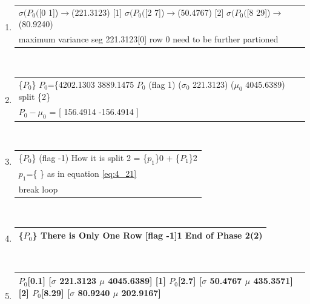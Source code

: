 \begin{center}
\begin{enumerate}
\begin{tabular}{ | p{15cm} | }
\hline 
\end{tabular}\\ \vspace{3mm}

\item \begin{tabular}{ | p{15cm} | }\hline 
            [0] $\sigma(P_0($[0 1])$\rightarrow$(221.3123)
            [1] $\sigma(P_0($[2 7])$\rightarrow$(50.4767)
            [2] $\sigma(P_0($[8 29])$\rightarrow$(80.9240)
            \\ maximum variance seg 221.3123[0]
            row 0 need to be further partioned \\ 
\hline 
\end{tabular}\\ \vspace{3mm}

\item \begin{tabular}{ | p{15cm} | }\hline\{$P_{0}$\} {$P_{0}$}=\{4202.1303 3889.1475             $P_{0}$ (flag 1) ($\sigma_{0}$ 221.3123) ($\mu_{0}$ 4045.6389) split \{2\} \\ 
$P_{0}-\mu_{0}$ = [ 156.4914 -156.4914 ]  \\ 
\hline 
\end{tabular}\\ \vspace{3mm}

\item \begin{tabular}{ | p{15cm} | }\hline\{$P_{0}$\} 
            (flag -1) How it is split 2 = \{$p_{1}$\}0 + \{$P_{1}$\}2\\ 
$p_{1}$=\{ \} as in equation \ref{eq:4_21} \\ 
            break loop \\ 
\hline 
\end{tabular}\\ \vspace{3mm}

\item \begin{tabular}{ | p{15cm} | }\hline\{$P_{0}$\} 
            There is Only One Row [flag -1]1
            End of Phase 2(2) \\ 

\hline 
\end{tabular}\\ \vspace{3mm}

\item \begin{tabular}{ | p{15cm} | }\hline 
            [0] $P_0$[0.1]	[$\sigma$ 221.3123	$\mu$ 4045.6389]
            [1] $P_0$[2.7]	[$\sigma$ 50.4767	$\mu$ 435.3571]
            [2] $P_0$[8.29]	[$\sigma$ 80.9240	$\mu$ 202.9167]
\\ \hline 
\end{tabular}\\ \vspace{3mm}


\end{enumerate}
\end{center}
